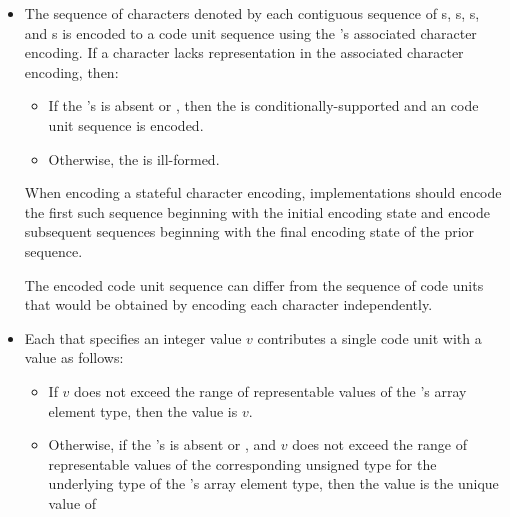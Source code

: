 \documentclass{wg21}
\begin{document}
\begin{itemize}
    \item
    The sequence of characters denoted by each contiguous sequence of
    s,
    s,
    s, and
    s
    is encoded to a code unit sequence
    using the 's associated character encoding.
    If a character lacks representation in the associated character encoding, then:
    \begin{itemize}
        \item
        If the 's 
        is absent or ,
        then the  is conditionally-supported and
        an
        code unit sequence is encoded.
        \item
        Otherwise, the  is ill-formed.
    \end{itemize}
    When encoding a stateful character encoding,
    implementations should encode the first such sequence
    beginning with the initial encoding state and
    encode subsequent sequences
    beginning with the final encoding state of the prior sequence.
    \begin{note}
        The encoded code unit sequence can differ from
        the sequence of code units that would be obtained by
        encoding each character independently.
    \end{note}
    \item
    Each 
    that specifies an integer value $v$
    contributes a single code unit with a value as follows:
    \begin{itemize}
        \item
        If $v$ does not exceed the range of representable values of
        the 's array element type,
        then the value is $v$.
        \item
        Otherwise,
        if the 's 
        is absent or , and
        $v$ does not exceed the range of representable values of
        the corresponding unsigned type for the underlying type of
        the 's array element type,
        then the value is the unique value of

\end{itemize}
\end{itemize}
\end{document}
